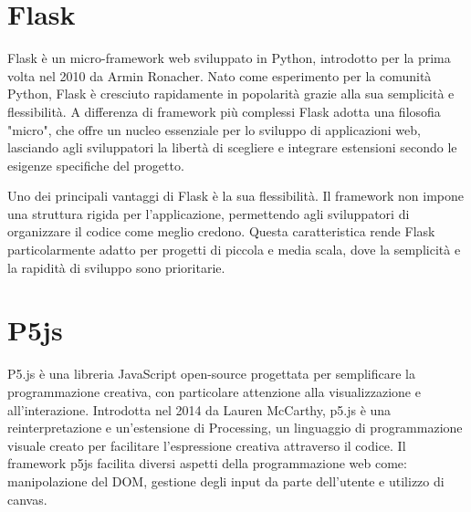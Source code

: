 \documentclass[a4paper, 11pt, titlepage, twoside, openany]{book}
\begin{document}
\section{Flask}
Flask è un micro-framework web sviluppato in Python, introdotto per la prima volta nel 2010 da Armin Ronacher. Nato come esperimento per la comunità Python, Flask è cresciuto rapidamente in popolarità grazie alla sua semplicità e flessibilità. A differenza di framework più complessi Flask adotta una filosofia "micro", che offre un nucleo essenziale per lo sviluppo di applicazioni web, lasciando agli sviluppatori la libertà di scegliere e integrare estensioni secondo le esigenze specifiche del progetto\cite{FlaskDocs}.

Uno dei principali vantaggi di Flask è la sua flessibilità. Il framework non impone una struttura rigida per l'applicazione, permettendo agli sviluppatori di organizzare il codice come meglio credono. Questa caratteristica rende Flask particolarmente adatto per progetti di piccola e media scala, dove la semplicità e la rapidità di sviluppo sono prioritarie.

\section{P5js}
P5.js è una libreria JavaScript open-source progettata per semplificare la programmazione creativa, con particolare attenzione alla visualizzazione e all'interazione. Introdotta nel 2014 da Lauren McCarthy\cite{lauren-mccarthy}, p5.js è una reinterpretazione e un'estensione di Processing\cite{processing}, un linguaggio di programmazione visuale creato per facilitare l'espressione creativa attraverso il codice.
Il framework p5js facilita diversi aspetti della programmazione web come: manipolazione del DOM, gestione degli input da parte dell'utente e utilizzo di canvas.
\end{document}
